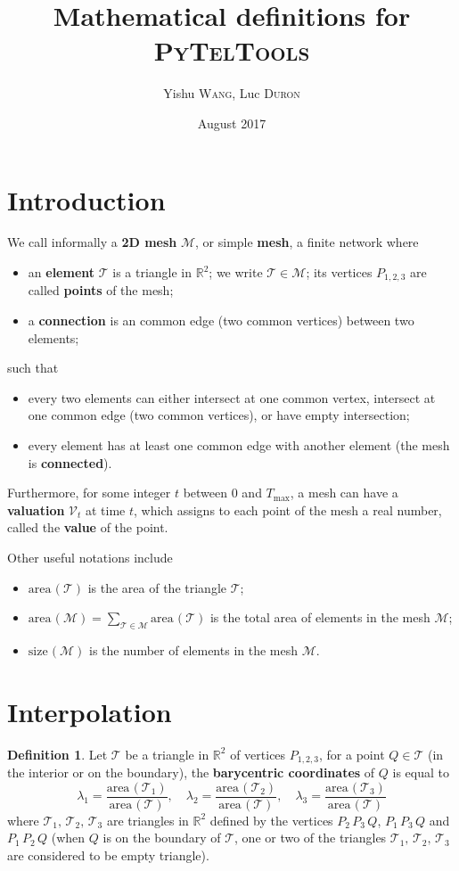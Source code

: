 \documentclass{article}
\title{Mathematical definitions for \textsc{PyTelTools}}
\author{Yishu \textsc{Wang}, Luc \textsc{Duron}}
\date{August 2017}
\theoremstyle{definition}
\newtheorem{defn}{Definition}
\newcommand{\RR}{\mathbb{R}}
\newcommand{\MM}{\mathcal{M}}
\newcommand{\VV}{\mathcal{V}}
\newcommand{\TT}{\mathcal{T}}
\newcommand{\area}{\mathrm{area}\hspace{1pt}}
\newcommand{\size}{\mathrm{size}\hspace{1pt}}
\begin{document}
\shorthandoff{:}

\maketitle
\small
\tableofcontents\newpage
\printindex
\normalsize

\section{Introduction}
We call informally a \textbf{2D mesh} $\MM$, or simple \textbf{mesh}, a finite network where
\begin{itemize}
\item an \textbf{element} $\TT$ is a triangle in $\RR^2$; we write $\TT\in\MM$; its vertices $P_{1,2,3}$ are called \textbf{points} of the mesh;
\item a \textbf{connection} is an common edge (two common vertices) between two elements;
\end{itemize}
such that
\begin{itemize}
\item every two elements can either intersect at one common vertex, intersect at one common edge (two common vertices), or have empty intersection;
\item every element has at least one common edge with another element (the mesh is \textbf{connected}).
\end{itemize}
Furthermore, for some integer $t$ between 0 and $T_{\max}$,
a mesh can have a \textbf{valuation} $\VV_t$ at time $t$, which assigns to each point of the mesh a real number, called the \textbf{value} of the point.

Other useful notations include
\begin{itemize}
\item $\area(\TT)$ is the area of the triangle $\TT$;
\item $\area(\MM)=\sum_{\TT\in\MM}\area(\TT)$ is the total area of elements in the mesh $\MM$;
\item $\size(\MM)$ is the number of elements in the mesh $\MM$.
\end{itemize}

\section{Interpolation}
\begin{defn}
Let $\TT$ be a triangle in $\RR^2$ of vertices $P_{1,2,3}$, for a point $Q\in\TT$ (in the interior or on the boundary), the \textbf{barycentric coordinates} of $Q$ is equal to
\[\lambda_1 = \frac{\area(\TT_1)}{\area(\TT)},\quad\lambda_2 = \frac{\area(\TT_2)}{\area(\TT)},\quad\lambda_3 = \frac{\area(\TT_3)}{\area(\TT)}\]
where $\TT_1,\,\TT_2,\,\TT_3$ are triangles in $\RR^2$ defined by the vertices $P_2\,P_3\,Q$, $P_1\,P_3\,Q$ and $P_1\,P_2\,Q$
(when $Q$ is on the boundary of $\TT$, one or two of the triangles $\TT_1,\,\TT_2,\,\TT_3$ are considered to be empty triangle).
\end{defn}
\end{document}
